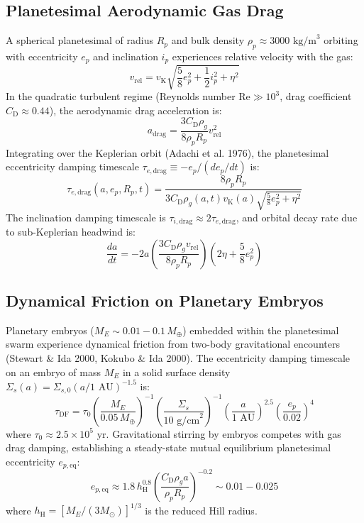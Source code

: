 \documentclass[11pt,a4paper]{article}
\begin{document}
\subsection{Planetesimal Aerodynamic Gas Drag}
A spherical planetesimal of radius $R_p$ and bulk density $\rho_p \approx 3000\text{ kg/m}^3$ orbiting with eccentricity $e_p$ and inclination $i_p$ experiences relative velocity with the gas:
\begin{equation}
v_{\text{rel}} = v_{\text{K}} \sqrt{\frac{5}{8}e_p^2 + \frac{1}{2}i_p^2 + \eta^2}
\end{equation}
In the quadratic turbulent regime (Reynolds number $\mathrm{Re} \gg 10^3$, drag coefficient $C_{\text{D}} \approx 0.44$), the aerodynamic drag acceleration is:
\begin{equation}
a_{\text{drag}} = \frac{3 C_{\text{D}} \rho_g}{8 \rho_p R_p} v_{\text{rel}}^2
\end{equation}
Integrating over the Keplerian orbit (Adachi et al. 1976), the planetesimal eccentricity damping timescale $\tau_{e,\text{drag}} \equiv -e_p / (de_p/dt)$ is:
\begin{equation}
\tau_{e,\text{drag}}(a, e_p, R_p, t) = \frac{8 \rho_p R_p}{3 C_{\text{D}} \rho_g(a,t) v_{\text{K}}(a) \sqrt{\frac{5}{8}e_p^2 + \eta^2}}
\end{equation}
The inclination damping timescale is $\tau_{i,\text{drag}} \approx 2 \tau_{e,\text{drag}}$, and orbital decay rate due to sub-Keplerian headwind is:
\begin{equation}
\frac{da}{dt} = -2 a \left(\frac{3 C_{\text{D}} \rho_g v_{\text{rel}}}{8 \rho_p R_p}\right) \left(2\eta + \frac{5}{8}e_p^2\right)
\end{equation}

\subsection{Dynamical Friction on Planetary Embryos}
Planetary embryos ($M_E \sim 0.01-0.1\,M_\oplus$) embedded within the planetesimal swarm experience dynamical friction from two-body gravitational encounters (Stewart \& Ida 2000, Kokubo \& Ida 2000). The eccentricity damping timescale on an embryo of mass $M_E$ in a solid surface density $\Sigma_s(a) = \Sigma_{s,0}(a/1\text{ AU})^{-1.5}$ is:
\begin{equation}
\tau_{\text{DF}} = \tau_0 \left(\frac{M_E}{0.05\,M_\oplus}\right)^{-1} \left(\frac{\Sigma_s}{10\text{ g/cm}^2}\right)^{-1} \left(\frac{a}{1\text{ AU}}\right)^{2.5} \left(\frac{e_p}{0.02}\right)^4
\end{equation}
where $\tau_0 \approx 2.5 \times 10^5\text{ yr}$. Gravitational stirring by embryos competes with gas drag damping, establishing a steady-state mutual equilibrium planetesimal eccentricity $e_{p,\text{eq}}$:
\begin{equation}
e_{p,\text{eq}} \approx 1.8 \, h_{\text{H}}^{0.8} \left(\frac{C_{\text{D}} \rho_g a}{\rho_p R_p}\right)^{-0.2} \sim 0.01 - 0.025
\end{equation}
where $h_{\text{H}} = [M_E / (3M_\odot)]^{1/3}$ is the reduced Hill radius.
\end{document}
